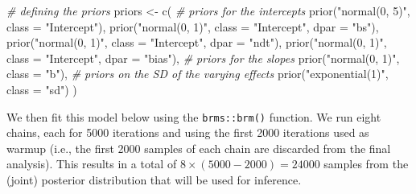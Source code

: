 \documentclass[
  11pt,
  english,
  ,doc,floatsintext]{apa6}
\newenvironment{Shaded}{}{}
\newcommand{\AttributeTok}[1]{\textcolor[rgb]{0.49,0.56,0.16}{#1}}
\newcommand{\CommentTok}[1]{\textcolor[rgb]{0.38,0.63,0.69}{\textit{#1}}}
\newcommand{\FunctionTok}[1]{\textcolor[rgb]{0.02,0.16,0.49}{#1}}
\newcommand{\NormalTok}[1]{#1}
\newcommand{\OtherTok}[1]{\textcolor[rgb]{0.00,0.44,0.13}{#1}}
\newcommand{\StringTok}[1]{\textcolor[rgb]{0.25,0.44,0.63}{#1}}
\begin{document}
\begin{Shaded}
\begin{Highlighting}[]
\CommentTok{\# defining the priors}
\NormalTok{priors }\OtherTok{\textless{}{-}} \FunctionTok{c}\NormalTok{(}
  \CommentTok{\# priors for the intercepts}
  \FunctionTok{prior}\NormalTok{(}\StringTok{"normal(0, 5)"}\NormalTok{, }\AttributeTok{class =} \StringTok{"Intercept"}\NormalTok{),}
  \FunctionTok{prior}\NormalTok{(}\StringTok{"normal(0, 1)"}\NormalTok{, }\AttributeTok{class =} \StringTok{"Intercept"}\NormalTok{, }\AttributeTok{dpar =} \StringTok{"bs"}\NormalTok{),}
  \FunctionTok{prior}\NormalTok{(}\StringTok{"normal(0, 1)"}\NormalTok{, }\AttributeTok{class =} \StringTok{"Intercept"}\NormalTok{, }\AttributeTok{dpar =} \StringTok{"ndt"}\NormalTok{),}
  \FunctionTok{prior}\NormalTok{(}\StringTok{"normal(0, 1)"}\NormalTok{, }\AttributeTok{class =} \StringTok{"Intercept"}\NormalTok{, }\AttributeTok{dpar =} \StringTok{"bias"}\NormalTok{),}
  \CommentTok{\# priors for the slopes}
  \FunctionTok{prior}\NormalTok{(}\StringTok{"normal(0, 1)"}\NormalTok{, }\AttributeTok{class =} \StringTok{"b"}\NormalTok{),}
  \CommentTok{\# priors on the SD of the varying effects}
  \FunctionTok{prior}\NormalTok{(}\StringTok{"exponential(1)"}\NormalTok{, }\AttributeTok{class =} \StringTok{"sd"}\NormalTok{)}
\NormalTok{  )}
\end{Highlighting}
\end{Shaded}

We then fit this model below using the \texttt{brms::brm()} function. We run eight chains, each for 5000 iterations and using the first 2000 iterations used as warmup (i.e., the first 2000 samples of each chain are discarded from the final analysis). This results in a total of \(8 \times (5000 - 2000) = 24000\) samples from the (joint) posterior distribution that will be used for inference.
\end{document}
